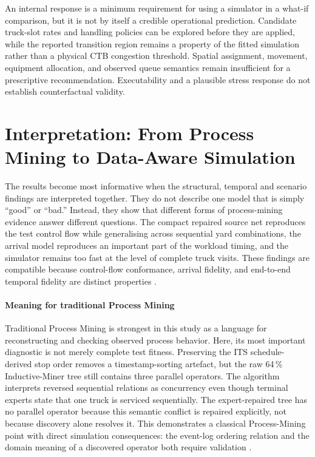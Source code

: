 An internal response is a minimum requirement for using a simulator in a
what-if comparison, but it is not by itself a credible operational prediction.
Candidate truck-slot rates and handling policies can be explored before they
are applied, while the reported transition region remains a property of the
fitted simulation rather than a physical CTB congestion threshold. Spatial
assignment, movement, equipment allocation, and observed queue semantics remain
insufficient for a prescriptive recommendation. Executability and a plausible
stress response do not establish counterfactual validity.

\section{Interpretation: From Process Mining to Data-Aware Simulation}
\label{sec:results_interpretation}

The results become most informative when the structural, temporal and
scenario findings are interpreted together. They do not describe one model
that is simply ``good'' or ``bad.'' Instead, they show that different forms of
process-mining evidence answer different questions. The compact repaired
source net reproduces the test control flow while generalising across sequential
yard combinations, the arrival model reproduces an important part of the
workload timing, and the simulator remains too fast at the level of complete
truck visits. These findings are compatible because control-flow conformance,
arrival fidelity, and end-to-end temporal fidelity are distinct properties
\cite{Camargo2021,ChapelaCampa2023Trust,Chapela2025SimQuality}.

\paragraph{Meaning for traditional Process Mining}
Traditional Process Mining is strongest in this study as a language for
reconstructing and checking observed process behavior. Here, its most
important diagnostic is not merely complete test fitness. Preserving the ITS
schedule-derived stop order removes a timestamp-sorting artefact, but the raw
64\,\% Inductive-Miner tree still contains three parallel operators. The
algorithm interprets reversed sequential relations as concurrency even though
terminal experts state that one truck is serviced sequentially. The
expert-repaired tree
has no parallel operator because this semantic conflict is repaired explicitly,
not because discovery alone resolves it. This demonstrates a classical
Process-Mining point with direct simulation consequences: the event-log
ordering relation and the domain meaning of a discovered operator both require
validation
\cite{PMRozinat2009,PMvanDerAalst2016}.

